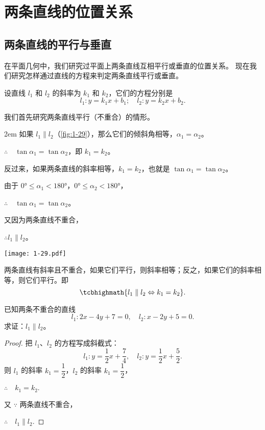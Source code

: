 \section{两条直线的位置关系}
\subsection{两条直线的平行与垂直}
在平面几何中，我们研究过平面上两条直线互相平行或垂直的位置关系。
现在我们研究怎样通过直线的方程来判定两条直线平行或垂直。

设直线 $l_1$ 和 $l_2$ 的斜率为 $k_1$ 和 $k_2$，它们的方程分别是
\[ l_1:y =k_1x+b_1;\quad l_2:y =k_2x+b_2. \]

我们首先研究两条直线平行（不重合）的情形。

\medskip\noindent
\begin{minipage}{0.6\linewidth}\parindent2em
如果 $l_1\parallel l_2$（\cref{fig:1-29}），那么它们的倾斜角相等，$\alpha_1=\alpha_2$。

$\therefore \quad \tan\alpha_1=\tan\alpha_2$，即 $k_1=k_2$。

反过来，如果两条直线的斜率相等，$k_1=k_2$，也就是 $\tan\alpha_1=\tan\alpha_2$。

由于 $\ang{0}\leqslant\alpha_1<\ang{180}$，$\ang{0}\leqslant\alpha_2<\ang{180}$，

$\therefore \quad \tan\alpha_1=\tan\alpha_2$。

又因为两条直线不重合，

$\therefore l_1\parallel l_2$。
\end{minipage}\hfill
\begin{minipage}{0.35\linewidth}\centering
\begin{figurehere}
  \texttt{[image: 1-29.pdf]}
  \caption{}\label{fig:1-29}
\end{figurehere}
\end{minipage}

\bigskip
两条直线有斜率且不重合，如果它们平行，则斜率相等；反之，如果它们的斜率相等，则它们平行。即
\[ \tcbhighmath{l_1\parallel l_2 \Leftrightarrow k_1=k_2}.\]
\begin{example}
  已知两条不重合的直线
  \[ l_1:2x-4y+7=0,\quad l_2:x-2y+5=0. \]
  求证：$l_1\parallel l_2$。
\end{example}
\begin{proof}
  把 $l_1$、$l_2$ 的方程写成斜截式：
  \[ l_1:y=\frac{1}{2}x+\frac{7}{4},\quad l_2:y=\frac{1}{2}x+\frac{5}{2}. \]
  则 $l_1$ 的斜率 $k_1=\dfrac{1}{2}$，$l_2$ 的斜率 $k_1=\dfrac{1}{2}$，
  
  $\therefore\quad k_1=k_2.$

  又 $\because$ 两条直线不重合，

  $\therefore\quad l_1\parallel l_2.$
\end{proof}


